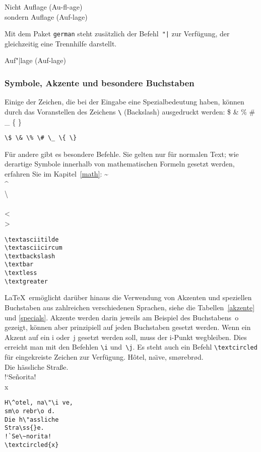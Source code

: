 \begin{LTXexample}
Nicht Auflage (Au-fl-age) \\
sondern Auf\/lage (Auf-lage)
\end{LTXexample}

Mit dem Paket \texttt{german} steht zusätzlich der
Befehl~\lstinline:"|: zur Verfügung, der gleichzeitig eine
Trennhilfe darstellt.

\begin{LTXexample}
Auf"|lage (Auf-lage)
\end{LTXexample}

\subsubsection{Symbole, Akzente und besondere Buchstaben}\label{symbole}

Einige der Zeichen, die bei der Eingabe eine Spezialbedeutung haben,
können durch das Voranstellen des
Zeichens \lstinline|\| (Backslash) ausgedruckt werden:
\exa
\$ \& \% \# \_ \{ \}
\exb
\begin{verbatim}
\$ \& \% \# \_ \{ \}
\end{verbatim}
\exc
Für andere gibt es besondere Befehle.  Sie gelten nur für normalen
Text; wie derartige Symbole innerhalb von mathematischen
Formeln gesetzt werden, erfahren Sie im Kapitel~\ref{math}:
\exa
\textasciitilde \\
\textasciicircum \\
\textbackslash \\
\textbar \\ 
\textless\\
\textgreater
\exb
\begin{verbatim}
\textasciitilde
\textasciicircum
\textbackslash 
\textbar  
\textless  
\textgreater
\end{verbatim}
\exc

\LaTeX\ ermöglicht darüber hinaus die Verwendung von Akzenten 
und speziellen Buchstaben aus zahlreichen verschiedenen Sprachen, 
siehe die Tabellen~\ref{akzente}  und \ref{specials}.
Akzente werden darin jeweils am Beispiel
des Buchstabens~o gezeigt, können aber prinzipiell auf jeden
Buchstaben gesetzt werden.
Wenn ein Akzent auf ein i oder~j gesetzt werden soll, muss der
\mbox{i-Punkt} wegbleiben. Dies erreicht man mit den Befehlen
\lstinline|\i| und~\lstinline|\j|.
Es steht auch ein Befehl \lstinline|\textcircled| für 
eingekreiste Zeichen zur Verfügung.
\exa
Hôtel, na\"\i ve, smørebrød.\\[1\baselineskip]
Die hässliche Straße.\\[1\baselineskip]
!`Señorita!\\
\textcircled{x}
\exb
\begin{verbatim}
H\^otel, na\"\i ve,
sm\o rebr\o d.
Die h\"assliche
Stra\ss{}e.
!`Se\~norita!
\textcircled{x}
\end{verbatim}
\exc


